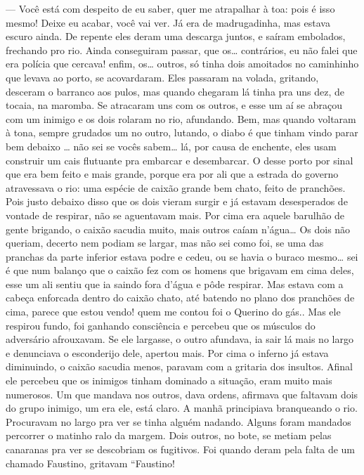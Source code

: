 \begin{linenumbers}
--- Você está com despeito de eu saber, quer me atrapalhar à toa: pois é
isso mesmo! Deixe eu acabar, você vai ver. Já era de madrugadinha, mas
estava escuro ainda. De repente eles deram uma descarga juntos, e saíram
embolados, frechando pro rio. Ainda conseguiram passar, que os\ldots{}
contrários, eu não falei que era polícia que cercava! enfim, os\ldots{}
outros, só tinha dois amoitados no caminhinho que levava ao porto, se
acovardaram. Eles passaram na volada, gritando, desceram o barranco aos
pulos, mas quando chegaram lá tinha pra uns dez, de tocaia, na maromba.
Se atracaram uns com os outros, e esse um aí se abraçou com um inimigo e
os dois rolaram no rio, afundando. Bem, mas quando voltaram à tona,
sempre grudados um no outro, lutando, o diabo é que tinham vindo parar
bem debaixo \ldots{} não sei se vocês sabem\ldots{} lá, por causa de enchente,
eles usam construir um cais flutuante pra embarcar e desembarcar. O
desse porto por sinal que era bem feito e mais grande, porque era por
ali que a estrada do governo atravessava o rio: uma espécie de caixão
grande bem chato, feito de pranchões. Pois justo debaixo disso que os
dois vieram surgir e já estavam desesperados de vontade de respirar, não
se aguentavam mais. Por cima era aquele barulhão de gente brigando, o
caixão sacudia muito, mais outros caíam n'água\ldots{} Os dois não queriam,
decerto nem podiam se largar, mas não sei como foi, se uma das pranchas
da parte inferior estava podre e cedeu, ou se havia o buraco mesmo\ldots{}
sei é que num balanço que o caixão fez com os homens que brigavam em
cima deles, esse um ali sentiu que ia saindo fora d'água e pôde
respirar. Mas estava com a cabeça enforcada dentro do caixão chato, até
batendo no plano dos pranchões de cima, parece que estou vendo! quem me
contou foi o Querino do gás.. Mas ele respirou fundo, foi ganhando
consciência e percebeu que os músculos do adversário afrouxavam. Se ele
largasse, o outro afundava, ia sair lá mais no largo e denunciava o
esconderijo dele, apertou mais. Por cima o inferno já estava diminuindo,
o caixão sacudia menos, paravam com a gritaria dos insultos. Afinal ele
percebeu que os inimigos tinham dominado a situação, eram muito mais
numerosos. Um que mandava nos outros, dava ordens, afirmava que faltavam
dois do grupo inimigo, um era ele, está claro. A manhã principiava
branqueando o rio. Procuravam no largo pra ver se tinha alguém nadando.
Alguns foram mandados percorrer o matinho ralo da margem. Dois outros,
no bote, se metiam pelas canaranas pra ver se descobriam os fugitivos.
Foi quando deram pela falta de um chamado Faustino, gritavam ``Faustino!

\end{linenumbers}
